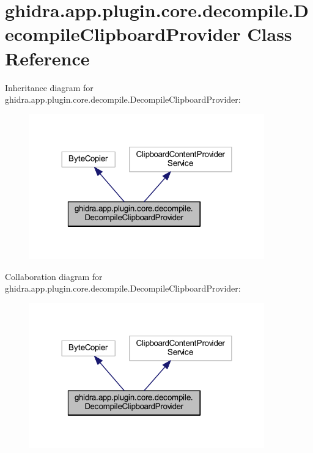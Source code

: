 \hypertarget{classghidra_1_1app_1_1plugin_1_1core_1_1decompile_1_1_decompile_clipboard_provider}{}\section{ghidra.\+app.\+plugin.\+core.\+decompile.\+Decompile\+Clipboard\+Provider Class Reference}
\label{classghidra_1_1app_1_1plugin_1_1core_1_1decompile_1_1_decompile_clipboard_provider}


Inheritance diagram for ghidra.\+app.\+plugin.\+core.\+decompile.\+Decompile\+Clipboard\+Provider\+:
\nopagebreak
\begin{figure}[H]
\begin{center}
\leavevmode
\includegraphics[width=288pt]{classghidra_1_1app_1_1plugin_1_1core_1_1decompile_1_1_decompile_clipboard_provider__inherit__graph}
\end{center}
\end{figure}


Collaboration diagram for ghidra.\+app.\+plugin.\+core.\+decompile.\+Decompile\+Clipboard\+Provider\+:
\nopagebreak
\begin{figure}[H]
\begin{center}
\leavevmode
\includegraphics[width=288pt]{classghidra_1_1app_1_1plugin_1_1core_1_1decompile_1_1_decompile_clipboard_provider__coll__graph}
\end{center}
\end{figure}
